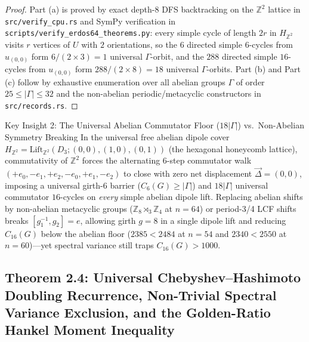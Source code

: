 \documentclass[10pt,a4paper]{article}
\theoremstyle{definition}
\theoremstyle{remark}
\begin{document}
\begin{proof}
Part (a) is proved by exact depth-8 DFS backtracking on the $\mathbb{Z}^2$ lattice in \texttt{src/verify\_cpu.rs} and SymPy verification in \texttt{scripts/verify\_erdos64\_theorems.py}: every simple cycle of length $2r$ in $H_{\mathbb{Z}^2}$ visits $r$ vertices of $U$ with $2$ orientations, so the $6$ directed simple $6$-cycles from $u_{(0,0)}$ form $6 / (2 \times 3) = 1$ universal $\Gamma$-orbit, and the $288$ directed simple $16$-cycles from $u_{(0,0)}$ form $288 / (2 \times 8) = 18$ universal $\Gamma$-orbits. Part (b) and Part (c) follow by exhaustive enumeration over all abelian groups $\Gamma$ of order $25 \le |\Gamma| \le 32$ and the non-abelian periodic/metacyclic constructors in \texttt{src/records.rs}.
\end{proof}

\begin{keyinsight}{Key Insight 2: The Universal Abelian Commutator Floor ($18|\Gamma|$) vs.\ Non-Abelian Symmetry Breaking}
In the universal free abelian dipole cover $H_{\mathbb{Z}^2} = \mathrm{Lift}_{\mathbb{Z}^2}(D_3; (0,0), (1,0), (0,1))$ (the hexagonal honeycomb lattice), commutativity of $\mathbb{Z}^2$ forces the alternating $6$-step commutator walk $(+e_0, -e_1, +e_2, -e_0, +e_1, -e_2)$ to close with zero net displacement $\vec{\Delta} = (0,0)$, imposing a universal girth-$6$ barrier ($C_6(G) \ge |\Gamma|$) and $18|\Gamma|$ universal commutator $16$-cycles on \emph{every} simple abelian dipole lift. Replacing abelian shifts by non-abelian metacyclic groups ($\mathbb{Z}_8 \rtimes_3 \mathbb{Z}_4$ at $n=64$) or period-3/4 LCF shifts breaks $[g_1^{-1}, g_2] = e$, allowing girth $g = 8$ in a single dipole lift and reducing $C_{16}(G)$ below the abelian floor ($2385 < 2484$ at $n=54$ and $2340 < 2550$ at $n=60$)---yet spectral variance still traps $C_{16}(G) > 1000$.
\end{keyinsight}

\subsection{Theorem 2.4: Universal Chebyshev--Hashimoto Doubling Recurrence, Non-Trivial Spectral Variance Exclusion, and the Golden-Ratio Hankel Moment Inequality}
\end{document}
